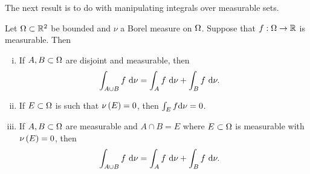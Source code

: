\documentclass[11pt]{report}
\begin{document}
The next result is to do with manipulating integrals over measurable sets.
\begin{lemma}
	Let $\Omega\subset\mathbb{R}^2$ be bounded and $\nu$ a Borel measure on $\Omega$.
	Suppose that $f:\Omega\rightarrow\mathbb{R}$ is measurable.
	Then
	\begin{enumerate}[(i)]
		\item If $A,B\subset\Omega$ are disjoint and measurable, then
		\begin{align*}
			\int_{A\cup B}f \ \mathrm{d}\nu &= \int_{A}f \ \mathrm{d}\nu + \int_{B}f \ \mathrm{d}\nu.
		\end{align*}
		\item If $E\subset\Omega$ is such that $\nu\left( E \right)=0$, then $\int_E f \mathrm{d}\nu = 0$.
		\item If $A,B\subset\Omega$ are measurable and $A\cap B = E$ where $E\subset\Omega$ is measurable with $\nu\left( E \right)=0$, then
		\begin{align*}
			\int_{A\cup B}f \ \mathrm{d}\nu &= \int_{A}f \ \mathrm{d}\nu + \int_{B}f \ \mathrm{d}\nu.
		\end{align*}
	\end{enumerate}
\end{lemma}
\end{document}
